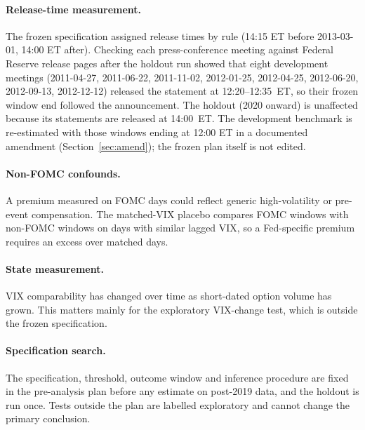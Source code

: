 \paragraph{Release-time measurement.} The frozen specification assigned release times by rule (14:15 ET before 2013-03-01, 14:00 ET after). Checking each press-conference meeting against Federal Reserve release pages after the holdout run showed that eight development meetings (2011-04-27, 2011-06-22, 2011-11-02, 2012-01-25, 2012-04-25, 2012-06-20, 2012-09-13, 2012-12-12) released the statement at 12:20--12:35~ET, so their frozen window end followed the announcement. The holdout (2020 onward) is unaffected because its statements are released at 14:00~ET. The development benchmark is re-estimated with those windows ending at 12:00 ET in a documented amendment (Section~\ref{sec:amend}); the frozen plan itself is not edited.

\paragraph{Non-FOMC confounds.} A premium measured on FOMC days could reflect
generic high-volatility or pre-event compensation. The matched-VIX placebo
compares FOMC windows with non-FOMC windows on days with similar lagged VIX, so a
Fed-specific premium requires an excess over matched days.

\paragraph{State measurement.} VIX comparability has changed over time as
short-dated option volume has grown. This matters mainly for the exploratory
VIX-change test, which is outside the frozen specification.

\paragraph{Specification search.} The specification, threshold, outcome window and
inference procedure are fixed in the pre-analysis plan before any estimate on
post-2019 data, and the holdout is run once. Tests outside the plan are labelled
exploratory and cannot change the primary conclusion.
